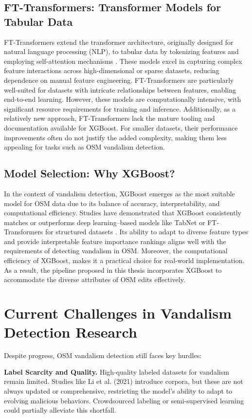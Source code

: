 \documentclass[
    13pt, %
    a4paper, %
    DIV14, %
    listof=totoc, %
    bibliography=totoc, %
    index=totoc, %
    headsepline
]{scrreprt}
\begin{document}
\subsection{FT-Transformers: Transformer Models for Tabular Data}
FT-Transformers extend the transformer architecture, originally designed for natural language processing (NLP), to tabular data by tokenizing features and employing self-attention mechanisms \cite{Gorishniy2021}. These models excel in capturing complex feature interactions across high-dimensional or sparse datasets, reducing dependence on manual feature engineering. FT-Transformers are particularly well-suited for datasets with intricate relationships between features, enabling end-to-end learning. However, these models are computationally intensive, with significant resource requirements for training and inference. Additionally, as a relatively new approach, FT-Transformers lack the mature tooling and documentation available for XGBoost. For smaller datasets, their performance improvements often do not justify the added complexity, making them less appealing for tasks such as OSM vandalism detection.

\subsection{Model Selection: Why XGBoost?}
In the context of vandalism detection, XGBoost emerges as the most suitable model for OSM data due to its balance of accuracy, interpretability, and computational efficiency. Studies have demonstrated that XGBoost consistently matches or outperforms deep learning–based models like TabNet or FT-Transformers for structured datasets \cite{Chen2016, Gorishniy2021}. Its ability to adapt to diverse feature types and provide interpretable feature importance rankings aligns well with the requirements of detecting vandalism in OSM. Moreover, the computational efficiency of XGBoost, makes it a practical choice for real-world implementation. As a result, the pipeline proposed in this thesis incorporates XGBoost to accommodate the diverse attributes of OSM edits effectively.


\section{Current Challenges in Vandalism Detection Research}

Despite progress, OSM vandalism detection still faces key hurdles:

\noindent
\textbf{Label Scarcity and Quality.}
High-quality labeled datasets for vandalism remain limited. Studies like Li et al. (2021) \cite{Li2021} introduce corpora, but these are not always updated or comprehensive, restricting the model’s ability to adapt to evolving malicious behaviors. Crowdsourced labeling or semi-supervised learning could partially alleviate this shortfall.
\end{document}

